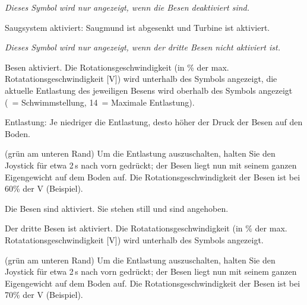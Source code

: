 
{\em Dieses Symbol wird nur angezeigt, wenn die Besen deaktiviert sind.}

\startSymVpad
{}
\SymVpad
{} Saugsystem aktiviert:
Saugmund ist abgesenkt und Turbine ist aktiviert.
\stopSymVpad



{\em Dieses Symbol wird nur angezeigt, wenn der dritte Besen nicht aktiviert ist.}

\startSymVpad
{}
\SymVpad
{} Besen aktiviert. Die Rotationsgeschwindigkeit (in \% der max. Rotatationsgeschwindigkeit [V]) wird unterhalb des Symbols angezeigt, die aktuelle Entlastung des jeweiligen Besens wird oberhalb  des Symbols angezeigt (\type{~}~= Schwimmstellung, 14~= Maximale Entlastung).

{\md Entlastung:} {\lt Je niedriger die Entlastung, desto höher der Druck der Besen auf den Boden.}
\stopSymVpad


\startSymVpad
{}
\SymVpad
{}(grün am unteren Rand)
Um die Entlastung auszuschalten, halten Sie den Joystick für etwa 2\,s nach vorn gedrückt; der Besen liegt nun mit seinem ganzen Eigengewicht auf dem Boden auf. Die Rotationsgeschwindigkeit der Besen ist bei 60\hairspace\% der V (Beispiel).
\stopSymVpad

\startSymVpad
{}
\SymVpad
{} Die Besen sind aktiviert. Sie stehen still und sind angehoben.
\stopSymVpad



\startSymVpad
{}
\SymVpad
{} Der dritte Besen ist aktiviert. Die Rotatationsgeschwindigkeit (in \% der max. Rotatationsgeschwindigkeit [V]) wird unterhalb des Symbols angezeigt.
\stopSymVpad


\startSymVpad
{}
\SymVpad
{}(grün am unteren Rand)
Um die Entlastung auszuschalten, halten Sie den Joystick für etwa 2\,s nach vorn gedrückt; der Besen liegt nun mit seinem ganzen Eigengewicht auf dem Boden auf. Die Rotationsgeschwindigkeit der Besen ist bei 70\hairspace\% der V (Beispiel).

